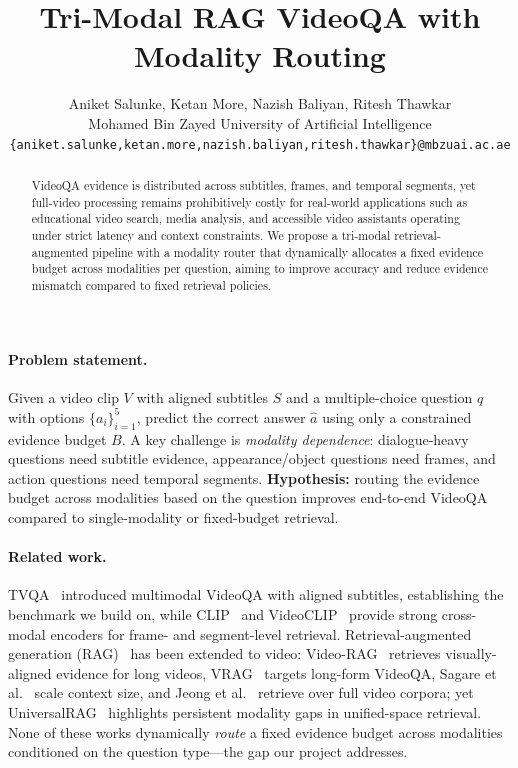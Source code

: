 \documentclass{article}
\title{Tri-Modal RAG VideoQA with Modality Routing}
\author{
  Aniket Salunke, Ketan More, Nazish Baliyan, Ritesh Thawkar \\
  Mohamed Bin Zayed University of Artificial Intelligence \\
  \texttt{\{aniket.salunke,ketan.more,nazish.baliyan,ritesh.thawkar\}@mbzuai.ac.ae}
}
\begin{document}
\maketitle
\vspace{-20pt}

\begin{abstract}\vspace{-2pt}
VideoQA evidence is distributed across subtitles, frames, and temporal segments, yet full-video processing remains prohibitively costly for real-world applications such as educational video search, media analysis, and accessible video assistants operating under strict latency and context constraints.
We propose a tri-modal retrieval-augmented pipeline with a modality router that dynamically allocates a fixed evidence budget across modalities per question, aiming to improve accuracy and reduce evidence mismatch compared to fixed retrieval policies.\vspace{-6pt}
\end{abstract}

\vspace{-4pt}
\paragraph{Problem statement.}
Given a video clip $V$ with aligned subtitles $S$ and a multiple-choice question $q$ with options $\{a_i\}_{i=1}^5$, predict the correct answer $\hat{a}$ using only a constrained evidence budget $B$.
A key challenge is \emph{modality dependence}: dialogue-heavy questions need subtitle evidence, appearance/object questions need frames, and action questions need temporal segments.
\textbf{Hypothesis:} routing the evidence budget across modalities based on the question improves end-to-end VideoQA compared to single-modality or fixed-budget retrieval.

\vspace{-2pt}
\paragraph{Related work.}
TVQA~\cite{lei2018tvqa} introduced multimodal VideoQA with aligned subtitles, establishing the benchmark we build on, while CLIP~\cite{radford2021clip} and VideoCLIP~\cite{xu2021videoclip} provide strong cross-modal encoders for frame- and segment-level retrieval.
Retrieval-augmented generation (RAG)~\cite{lewis2020rag} has been extended to video: Video-RAG~\cite{luo2024videorag} retrieves visually-aligned evidence for long videos, VRAG~\cite{gia2025vrag} targets long-form VideoQA, Sagare et al.~\cite{sagare2024videorag} scale context size, and Jeong et al.~\cite{jeong2025videorag} retrieve over full video corpora; yet UniversalRAG~\cite{yeo2025universalrag} highlights persistent modality gaps in unified-space retrieval.
None of these works dynamically \emph{route} a fixed evidence budget across modalities conditioned on the question type---the gap our project addresses.
\end{document}
